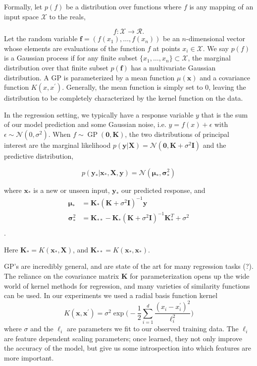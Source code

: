 \documentclass{sig-alternate}
\begin{document}
Formally, let $p(f)$ be a distribution over functions where $f$ is any mapping
of an input space $\mathcal{X}$ to the reals,

$$f: \mathcal{X} \rightarrow \mathcal{R}.$$ 
Let the random variable $\mathbf{f} = (f(x_1),\ldots,f(x_n) )$ be
 an $n$-dimensional vector whose elements are evaluations of the function $f$
at points $x_i \in \mathcal{X}$.
We say $p(f)$ is a Gaussian process if for any finite subset 
$\{x_1,\ldots,x_n\} \subset \mathcal{X}$, the marginal distribution over 
that finite subset $p(\mathbf{f})$ has a multivariate Gaussian distribution.
A GP is parameterized by a mean function $\mu(\mathbf{x})$ and a 
covariance function $K(x,x^\prime)$. Generally, the mean function is simply
set to 0, leaving the distribution to be completely characterized by the
kernel function on the data.

In the regression setting, we typically have a response variable $y$ that
is the sum of our model prediction  and 
some Gaussian noise, i.e. $y = f(x) + \epsilon$ with 
$\epsilon \sim \mathcal{N}(0, \sigma^2)$. When
$f \sim \operatorname{GP}(\mathbf{0}, \mathbf{K})$, the
two distributions
of principal interest are the marginal likelihood
$p(\mathbf{y}|\mathbf{X}) = 
\mathcal{N}(\mathbf{0},\mathbf{K} + \sigma^2\mathbf{I})$ and the predictive
distribution,

$$p(\mathbf{y_*}|\mathbf{x_*},\mathbf{X},\mathbf{y}) =
\mathcal{N}(\boldsymbol{\mu}_*, \boldsymbol{\sigma}^2_*) $$

where $\mathbf{x_*}$ is a new or unseen input, $\mathbf{y_*}$ our predicted
response, and
\begin{align*}
\boldsymbol{\mu}_* & = \mathbf{K_*}(\mathbf{K} + \sigma^2\mathbf{I})^{-1}\mathbf{y} \\
\boldsymbol{\sigma}^2_* & 
= \mathbf{K}_{**} - \mathbf{K}_*(\mathbf{K} + \sigma^2\mathbf{I})^{-1}
\mathbf{K}_*^T + \sigma^2\\
\end{align*}.

Here $\mathbf{K}_* = K(\mathbf{x}_*, \mathbf{X})$, and 
$\mathbf{K}_{**} = K(\mathbf{x}_*, \mathbf{x}_*)$.


GP's are incredibly general, and are state of the art for many regression 
tasks (?). The reliance on the covariance matrix 
$\mathbf{K}$ for parameterization opens up the wide world of kernel methods
for regression, and many varieties of similarity functions can be used.
In our experiments we used a radial basis function kernel 
$$K(\mathbf{x},\mathbf{x}^\prime) = \sigma^2 \exp\bigg(- \frac{1}{2} 
\sum_{i=1}^d \frac{ (x_i-x^\prime_i)^2}{\ell_i^2} \bigg)$$ where 
$\sigma$ and the $\ell_i$ are parameters we fit to our observed training data.
The $\ell_i$ are feature dependent scaling parameters; once learned, they not
only improve the accuracy of the model, but give us some introspection 
into which features are more important.
\end{document}
